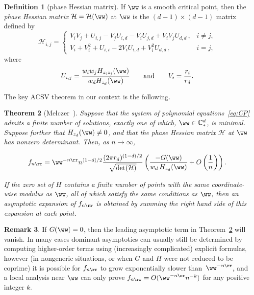 \documentclass[a4paper]{amsart}
\newtheorem{theorem}{Theorem}
\theoremstyle{definition}
\newtheorem{definition}[theorem]{Definition}
\newtheorem{remark}[theorem]{Remark}
\newcommand{\C}{{\mathbb C}}
\newcommand{\hes}{\mathcal{H}}
\begin{document}
\begin{definition}[phase Hessian matrix] 
    If $\ww$ is a smooth critical point, then the \emph{phase Hessian matrix} $\hes=\hes(\ww)$ at $\ww$ is the $(d-1)\times(d-1)$ matrix defined by
    \begin{equation}
    \hes_{i,j} = 
    \begin{cases}
        V_iV_j + U_{i,j} - V_jU_{i,d} - V_iU_{j,d} + V_iV_jU_{d,d}\, , & i \neq j, \\[+3mm]
        V_i + V_i^2 + U_{i,i} - 2V_iU_{i,d} + V_i^2U_{d,d}\, , & i=j,
    \end{cases}
    \label{eq:hes}
    \end{equation}
    where
    \[ U_{i,j} = \frac{w_iw_j H_{z_iz_j}(\ww)}{w_dH_{z_d}(\ww)} \qquad \text{and} \qquad V_i = \frac{r_i}{r_d}.\]
\end{definition}

The key ACSV theorem in our context is the following.

\begin{theorem}[{Melczer~\cite[Theorem 5.1]{Melczer2021}}]
    \label{thm:ACSV}
    Suppose that the system of polynomial equations~\eqref{eq:CP} admits a finite number of solutions, exactly one of which, $\ww\in\C_*^d$, is minimal. Suppose further that $H_{z_d}(\ww)\neq0$, and that the phase Hessian matrix $\hes$ at $\ww$ has nonzero determinant. Then, as $n\rightarrow\infty$,
    
    {\small
        \[
        f_{n\rr} = \ww^{-n\rr} n^{(1-d)/2} \frac{(2\pi r_d)^{(1-d)/2}}{\sqrt{\det(\hes)}} \left(\frac{-G(\ww)}{w_d\, H_{z_d}(\ww)} + O\left(\frac{1}{n}\right)\right).
        \]
    }
    
    If the zero set of $H$ contains a finite number of points with the same coordinate-wise modulus as $\ww$, all of which satisfy the same conditions as $\ww$, then an asymptotic expansion of $f_{n\rr}$ is obtained by summing the right hand side of this expansion at each point.
\end{theorem}

\begin{remark}
    If $G(\ww)=0$, then the leading asymptotic term in Theorem~\ref{thm:ACSV} will vanish. In many cases dominant asymptotics can usually still be determined by computing higher-order terms using (increasingly complicated) explicit formulas, however (in nongeneric situations, or when $G$ and $H$ were not reduced to be coprime) it is possible for $f_{n\rr}$ to grow exponentially slower than~$\ww^{-n\rr}$, and a local analysis near $\ww$ can only prove $f_{n\rr} = O(\ww^{-n\rr}n^{-k})$ for any positive integer $k$.
\end{remark}
\end{document}
